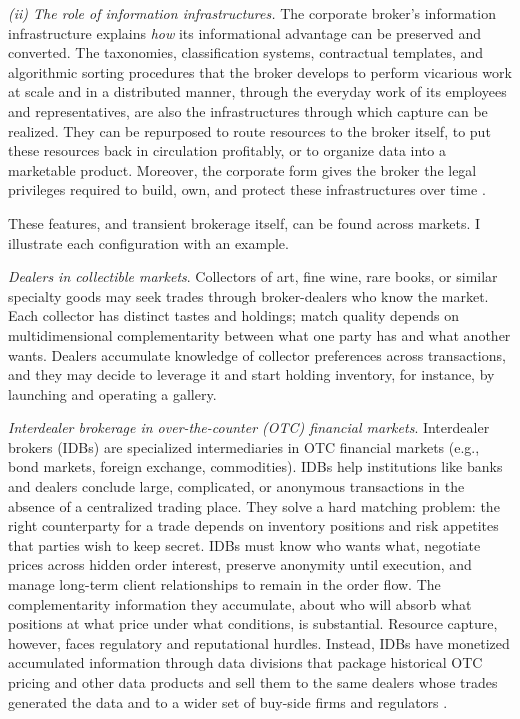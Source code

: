 \documentclass[
]{article}
\begin{document}
\emph{(ii) The role of information infrastructures.} The corporate broker's information infrastructure explains \emph{how} its informational advantage can be preserved and converted. The taxonomies, classification systems, contractual templates, and algorithmic sorting procedures that the broker develops to perform vicarious work at scale and in a distributed manner, through the everyday work of its employees and representatives, are also the infrastructures through which capture can be realized. They can be repurposed to route resources to the broker itself, to put these resources back in circulation profitably, or to organize data into a marketable product. Moreover, the corporate form gives the broker the legal privileges required to build, own, and protect these infrastructures over time \autocite{colemanAsymmetricSociety1982,pistorCodeCapitalHow2019}.

These features, and transient brokerage itself, can be found across markets. I illustrate each configuration with an example.

\emph{Dealers in collectible markets}. Collectors of art, fine wine, rare books, or similar specialty goods may seek trades through broker-dealers who know the market. Each collector has distinct tastes and holdings; match quality depends on multidimensional complementarity between what one party has and what another wants. Dealers accumulate knowledge of collector preferences across transactions, and they may decide to leverage it and start holding inventory, for instance, by launching and operating a gallery.

\emph{Interdealer brokerage in over-the-counter (OTC) financial markets}. Interdealer brokers (IDBs) are specialized intermediaries in OTC financial markets (e.g., bond markets, foreign exchange, commodities). IDBs help institutions like banks and dealers conclude large, complicated, or anonymous transactions in the absence of a centralized trading place. They solve a hard matching problem: the right counterparty for a trade depends on inventory positions and risk appetites that parties wish to keep secret. IDBs must know who wants what, negotiate prices across hidden order interest, preserve anonymity until execution, and manage long-term client relationships to remain in the order flow. The complementarity information they accumulate, about who will absorb what positions at what price under what conditions, is substantial. Resource capture, however, faces regulatory and reputational hurdles. Instead, IDBs have monetized accumulated information through data divisions that package historical OTC pricing and other data products and sell them to the same dealers whose trades generated the data and to a wider set of buy-side firms and regulators \autocites[see, e.g.][]{CapitalMarketsIndicative,ARA_FullReport}.
\end{document}
